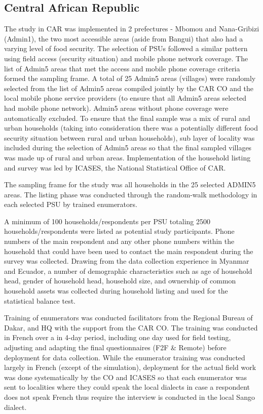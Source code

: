 \documentclass[11pt,harvard]{article}
\begin{document}
	
	\subsection{Central African Republic}
	
The study in CAR was implemented in 2 prefectures - Mbomou and Nana-Gribizi (Admin1), the two most accessible areas (aside from Bangui) that also had a varying level of food security. The selection of PSUs followed a similar pattern using field access (security situation) and mobile phone network coverage. The list of Admin5 areas that met the access and mobile phone coverage criteria formed the sampling frame. A total of 25 Admin5 areas (villages) were randomly selected from the list of Admin5 areas compiled jointly by the CAR CO and the local mobile phone service providers (to ensure that all Admin5 areas selected had mobile phone network). Admin5 areas without phone coverage were automatically excluded.
To ensure that the final sample was a mix of rural and urban households (taking into consideration there was a potentially different food security situation between rural and urban households), sub layer of locality was included during the selection of Admin5 areas so that the final sampled villages was made up of rural and urban areas. Implementation of the household listing and survey was led by ICASES, the National Statistical Office of CAR.

The sampling frame for the study was all households in the 25 selected ADMIN5 areas. The listing phase was conducted through the random-walk methodology in each selected PSU by trained enumerators. 

A minimum of 100 households/respondents per PSU totaling 2500 households/respondents were listed as potential study participants. Phone numbers of the main respondent and any other phone numbers within the household that could have been used to contact the main respondent during the survey was collected. Drawing from the data collection experience in Myanmar and Ecuador, a number of demographic characteristics such as age of household head, gender of household head, household size, and ownership of common household assets was collected during household listing and used for the statistical balance test.

Training of enumerators was conducted  facilitators from the Regional Bureau of Dakar, and HQ with the support from the CAR CO. The training was conducted in French over a in 4-day period, including one day used for field testing, adjusting and adapting the final questionnaires (F2F \& Remote) before deployment for data collection. While the  enumerator training was conducted largely in French (except of the simulation), deployment for the actual field work was done systematically by the CO and ICASES so that each enumerator was sent to localities where they could speak the local dialects in case a respondent does not speak French thus require the interview is conducted in the local Sango dialect.
 
\end{document}
